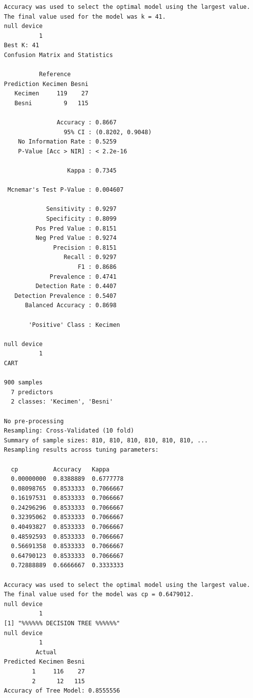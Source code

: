 \documentclass{article}
\begin{document}
\begin{thebibliography}{9}
\begin{verbatim}
Accuracy was used to select the optimal model using the largest value.
The final value used for the model was k = 41.
null device 
          1 
Best K: 41 
Confusion Matrix and Statistics

          Reference
Prediction Kecimen Besni
   Kecimen     119    27
   Besni         9   115
                                          
               Accuracy : 0.8667          
                 95% CI : (0.8202, 0.9048)
    No Information Rate : 0.5259          
    P-Value [Acc > NIR] : < 2.2e-16       
                                          
                  Kappa : 0.7345          
                                          
 Mcnemar's Test P-Value : 0.004607        
                                          
            Sensitivity : 0.9297          
            Specificity : 0.8099          
         Pos Pred Value : 0.8151          
         Neg Pred Value : 0.9274          
              Precision : 0.8151          
                 Recall : 0.9297          
                     F1 : 0.8686          
             Prevalence : 0.4741          
         Detection Rate : 0.4407          
   Detection Prevalence : 0.5407          
      Balanced Accuracy : 0.8698          
                                          
       'Positive' Class : Kecimen         
                                          
null device                                                                                                                     
          1 
CART 

900 samples
  7 predictors
  2 classes: 'Kecimen', 'Besni' 

No pre-processing
Resampling: Cross-Validated (10 fold) 
Summary of sample sizes: 810, 810, 810, 810, 810, 810, ... 
Resampling results across tuning parameters:

  cp          Accuracy   Kappa    
  0.00000000  0.8388889  0.6777778
  0.08098765  0.8533333  0.7066667
  0.16197531  0.8533333  0.7066667
  0.24296296  0.8533333  0.7066667
  0.32395062  0.8533333  0.7066667
  0.40493827  0.8533333  0.7066667
  0.48592593  0.8533333  0.7066667
  0.56691358  0.8533333  0.7066667
  0.64790123  0.8533333  0.7066667
  0.72888889  0.6666667  0.3333333

Accuracy was used to select the optimal model using the largest value.
The final value used for the model was cp = 0.6479012.
null device 
          1 
[1] "%%%%%% DECISION TREE %%%%%%"
null device 
          1 
         Actual
Predicted Kecimen Besni
        1     116    27
        2      12   115
Accuracy of Tree Model: 0.8555556 
  \end{verbatim}

\end{thebibliography}
\end{document}
